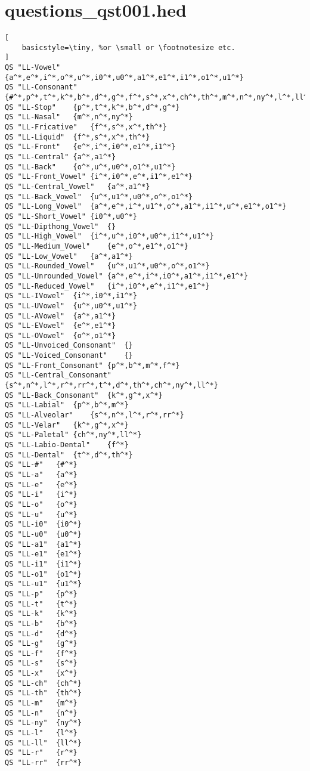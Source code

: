 \section{questions\_qst001.hed}\label{apendiceQuestions}

\begin{lstlisting}[
    basicstyle=\tiny, %or \small or \footnotesize etc.
]
QS "LL-Vowel"	{a^*,e^*,i^*,o^*,u^*,i0^*,u0^*,a1^*,e1^*,i1^*,o1^*,u1^*}
QS "LL-Consonant"	{#^*,p^*,t^*,k^*,b^*,d^*,g^*,f^*,s^*,x^*,ch^*,th^*,m^*,n^*,ny^*,l^*,ll^*,r^*,rr^*}
QS "LL-Stop"	{p^*,t^*,k^*,b^*,d^*,g^*}
QS "LL-Nasal"	{m^*,n^*,ny^*}
QS "LL-Fricative"	{f^*,s^*,x^*,th^*}
QS "LL-Liquid"	{f^*,s^*,x^*,th^*}
QS "LL-Front"	{e^*,i^*,i0^*,e1^*,i1^*}
QS "LL-Central"	{a^*,a1^*}
QS "LL-Back"	{o^*,u^*,u0^*,o1^*,u1^*}
QS "LL-Front_Vowel"	{i^*,i0^*,e^*,i1^*,e1^*}
QS "LL-Central_Vowel"	{a^*,a1^*}
QS "LL-Back_Vowel"	{u^*,u1^*,u0^*,o^*,o1^*}
QS "LL-Long_Vowel"	{a^*,e^*,i^*,u1^*,o^*,a1^*,i1^*,u^*,e1^*,o1^*}
QS "LL-Short_Vowel"	{i0^*,u0^*}
QS "LL-Dipthong_Vowel"	{}
QS "LL-High_Vowel"	{i^*,u^*,i0^*,u0^*,i1^*,u1^*}
QS "LL-Medium_Vowel"	{e^*,o^*,e1^*,o1^*}
QS "LL-Low_Vowel"	{a^*,a1^*}
QS "LL-Rounded_Vowel"	{u^*,u1^*,u0^*,o^*,o1^*}
QS "LL-Unrounded_Vowel"	{a^*,e^*,i^*,i0^*,a1^*,i1^*,e1^*}
QS "LL-Reduced_Vowel"	{i^*,i0^*,e^*,i1^*,e1^*}
QS "LL-IVowel"	{i^*,i0^*,i1^*}
QS "LL-UVowel"	{u^*,u0^*,u1^*}
QS "LL-AVowel"	{a^*,a1^*}
QS "LL-EVowel"	{e^*,e1^*}
QS "LL-OVowel"	{o^*,o1^*}
QS "LL-Unvoiced_Consonant"	{}
QS "LL-Voiced_Consonant"	{}
QS "LL-Front_Consonant"	{p^*,b^*,m^*,f^*}
QS "LL-Central_Consonant"	{s^*,n^*,l^*,r^*,rr^*,t^*,d^*,th^*,ch^*,ny^*,ll^*}
QS "LL-Back_Consonant"	{k^*,g^*,x^*}
QS "LL-Labial"	{p^*,b^*,m^*}
QS "LL-Alveolar"	{s^*,n^*,l^*,r^*,rr^*}
QS "LL-Velar"	{k^*,g^*,x^*}
QS "LL-Paletal"	{ch^*,ny^*,ll^*}
QS "LL-Labio-Dental"	{f^*}
QS "LL-Dental"	{t^*,d^*,th^*}
QS "LL-#"	{#^*}
QS "LL-a"	{a^*}
QS "LL-e"	{e^*}
QS "LL-i"	{i^*}
QS "LL-o"	{o^*}
QS "LL-u"	{u^*}
QS "LL-i0"	{i0^*}
QS "LL-u0"	{u0^*}
QS "LL-a1"	{a1^*}
QS "LL-e1"	{e1^*}
QS "LL-i1"	{i1^*}
QS "LL-o1"	{o1^*}
QS "LL-u1"	{u1^*}
QS "LL-p"	{p^*}
QS "LL-t"	{t^*}
QS "LL-k"	{k^*}
QS "LL-b"	{b^*}
QS "LL-d"	{d^*}
QS "LL-g"	{g^*}
QS "LL-f"	{f^*}
QS "LL-s"	{s^*}
QS "LL-x"	{x^*}
QS "LL-ch"	{ch^*}
QS "LL-th"	{th^*}
QS "LL-m"	{m^*}
QS "LL-n"	{n^*}
QS "LL-ny"	{ny^*}
QS "LL-l"	{l^*}
QS "LL-ll"	{ll^*}
QS "LL-r"	{r^*}
QS "LL-rr"	{rr^*}


\end{lstlisting}
